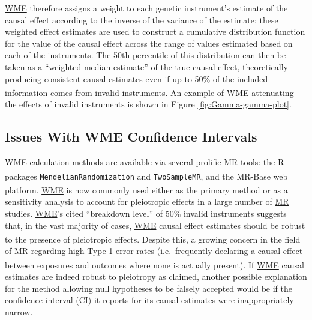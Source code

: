 \documentclass[
]{article}
\begin{document}
\hyperref[acronyms_WME]{WME} therefore assigns a weight to each genetic instrument's estimate of the causal effect according to the inverse of the variance of the estimate; these weighted effect estimates are used to construct a cumulative distribution function for the value of the causal effect across the range of values estimated based on each of the instruments. The 50th percentile of this distribution can then be taken as a ``weighted median estimate'' of the true causal effect, theoretically producing consistent causal estimates even if up to 50\% of the included information comes from invalid instruments\textsuperscript{}. An example of \hyperref[acronyms_WME]{WME} attenuating the effects of invalid instruments is shown in Figure \ref{fig:Gamma-gamma-plot}.

\subsection{Issues With WME Confidence Intervals}\label{issues-with-wme-confidence-intervals}

\hyperref[acronyms_WME]{WME} calculation methods are available via several prolific \hyperref[acronyms_MR]{MR} tools: the R packages \texttt{MendelianRandomization}\textsuperscript{} and \texttt{TwoSampleMR}, and the MR-Base web platform\textsuperscript{}. \hyperref[acronyms_WME]{WME} is now commonly used either as the primary method or as a sensitivity analysis to account for pleiotropic effects in a large number of \hyperref[acronyms_MR]{MR} studies. \hyperref[acronyms_WME]{WME}'s cited ``breakdown level'' of 50\% invalid instruments suggests that, in the vast majority of cases, \hyperref[acronyms_WME]{WME} causal effect estimates should be robust to the presence of pleiotropic effects\textsuperscript{}. Despite this, a growing concern in the field of \hyperref[acronyms_MR]{MR} regarding high Type 1 error rates (i.e.~frequently declaring a causal effect between exposures and outcomes where none is actually present)\textsuperscript{}. If \hyperref[acronyms_WME]{WME} causal estimates are indeed robust to pleiotropy as claimed, another possible explanation for the method allowing null hypotheses to be falsely accepted would be if the \hyperref[acronyms_CI]{confidence interval (CI)} it reports for its causal estimates were inappropriately narrow.
\end{document}
